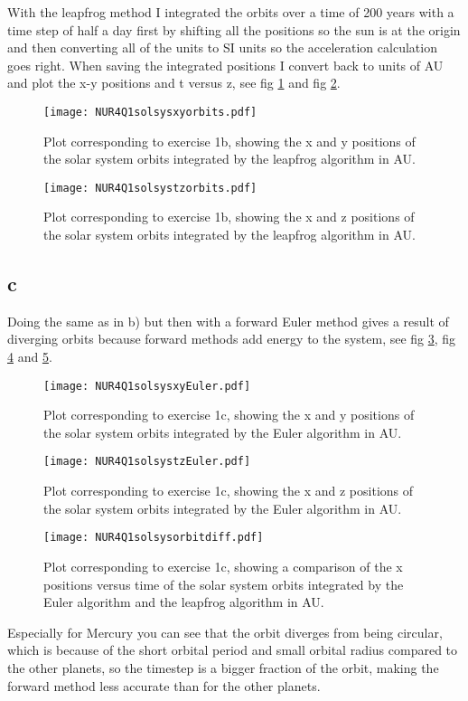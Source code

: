 With the leapfrog method I integrated the orbits over a time of 200 years with a time step of half a day first by shifting all the positions so the sun is at the origin and then converting all of the units to SI units so the acceleration calculation goes right. When saving the integrated positions I convert back to units of AU and plot the x-y positions and t versus z, see fig \ref{fig:fig3} and fig \ref{fig:fig4}.

\begin{figure}[h!]
  \centering
  \texttt{[image: NUR4Q1solsysxyorbits.pdf]}
  \caption{Plot corresponding to exercise 1b, showing the x and y positions of the solar system orbits integrated by the leapfrog algorithm in AU.}
  \label{fig:fig3}
\end{figure} 


\begin{figure}[h!]
  \centering
  \texttt{[image: NUR4Q1solsystzorbits.pdf]}
  \caption{Plot corresponding to exercise 1b, showing the x and z positions of the solar system orbits integrated by the leapfrog algorithm in AU.}
  \label{fig:fig4}
\end{figure} 

\subsection*{c}

Doing the same as in b) but then with a forward Euler method gives a result of diverging orbits because forward methods add energy to the system, see fig \ref{fig:fig5}, fig \ref{fig:fig6} and \ref{fig:fig7}.

\begin{figure}[h!]
  \centering
  \texttt{[image: NUR4Q1solsysxyEuler.pdf]}
  \caption{Plot corresponding to exercise 1c, showing the x and y positions of the solar system orbits integrated by the Euler algorithm in AU.}
  \label{fig:fig5}
\end{figure} 


\begin{figure}[h!]
  \centering
  \texttt{[image: NUR4Q1solsystzEuler.pdf]}
  \caption{Plot corresponding to exercise 1c, showing the x and z positions of the solar system orbits integrated by the Euler algorithm in AU.}
  \label{fig:fig6}
\end{figure} 


\begin{figure}[h!]
  \centering
  \texttt{[image: NUR4Q1solsysorbitdiff.pdf]}
  \caption{Plot corresponding to exercise 1c, showing a comparison of the x positions versus time of the solar system orbits integrated by the Euler algorithm and the leapfrog algorithm in AU.}
  \label{fig:fig7}
\end{figure} 


Especially for Mercury you can see that the orbit diverges from being circular, which is because of the short orbital period and small orbital radius compared to the other planets, so the timestep is a bigger fraction of the orbit, making the forward method less accurate than for the other planets.

